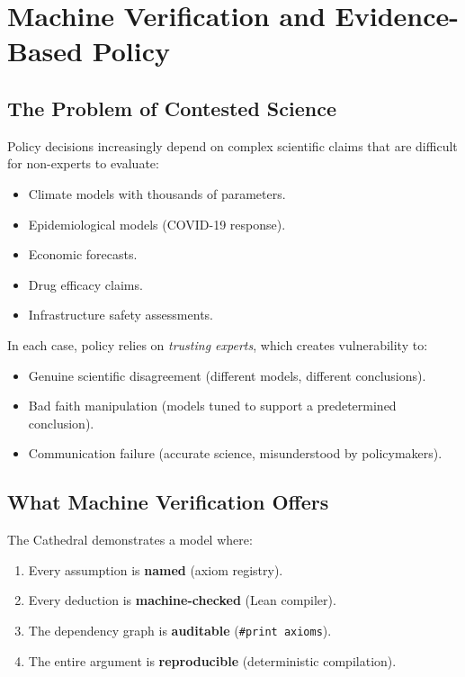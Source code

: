 \documentclass[11pt,a4paper]{article}
\begin{document}
\section{Machine Verification and Evidence-Based Policy}
\label{sec:evidence}

\subsection{The Problem of Contested Science}

Policy decisions increasingly depend on complex scientific claims
that are difficult for non-experts to evaluate:

\begin{itemize}
  \item Climate models with thousands of parameters.
  \item Epidemiological models (COVID-19 response).
  \item Economic forecasts.
  \item Drug efficacy claims.
  \item Infrastructure safety assessments.
\end{itemize}

In each case, policy relies on \emph{trusting experts}, which
creates vulnerability to:
\begin{itemize}
  \item Genuine scientific disagreement (different models, different
    conclusions).
  \item Bad faith manipulation (models tuned to support a
    predetermined conclusion).
  \item Communication failure (accurate science, misunderstood by
    policymakers).
\end{itemize}

\subsection{What Machine Verification Offers}

The Cathedral demonstrates a model where:
\begin{enumerate}
  \item Every assumption is \textbf{named} (axiom registry).
  \item Every deduction is \textbf{machine-checked} (Lean compiler).
  \item The dependency graph is \textbf{auditable} (\texttt{\#print
    axioms}).
  \item The entire argument is \textbf{reproducible} (deterministic
    compilation).
\end{enumerate}
\end{document}
